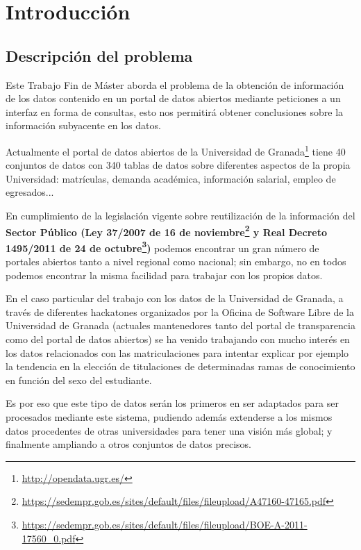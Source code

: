 \chapter{Introducción}

\section{Descripción del problema}

Este {\sf Trabajo Fin de Máster} aborda el problema de la obtención de información de los datos contenido en un portal de datos abiertos mediante peticiones a un interfaz en forma de consultas, esto nos permitirá obtener conclusiones sobre la información subyacente en los datos.

\bigskip
Actualmente el portal de datos abiertos de la {\sf Universidad de Granada}\footnote{\url{http://opendata.ugr.es/}} tiene 40 conjuntos de datos con 340 tablas de datos sobre diferentes aspectos de la propia Universidad: matrículas, demanda académica, información salarial, empleo de egresados...

\bigskip
En cumplimiento de la legislación vigente sobre reutilización de la información del \textbf{Sector Público (Ley 37/2007 de 16 de noviembre\footnote{\url{https://sedempr.gob.es/sites/default/files/fileupload/A47160-47165.pdf}} y Real Decreto 1495/2011 de 24 de octubre\footnote{\url{https://sedempr.gob.es/sites/default/files/fileupload/BOE-A-2011-17560\_0.pdf}})} podemos encontrar un gran número de portales abiertos tanto a nivel regional como nacional; sin embargo, no en todos podemos encontrar la misma facilidad para trabajar con los propios datos.

\bigskip
En el caso particular del trabajo con los datos de la {\sf Universidad de Granada}, a través de diferentes hackatones organizados por la {\sf Oficina de Software Libre de la Universidad de Granada} (actuales mantenedores tanto del portal de transparencia como del portal de datos abiertos) se ha venido trabajando con mucho interés en los datos relacionados con las matriculaciones para intentar explicar por ejemplo la tendencia en la elección de titulaciones de determinadas ramas de conocimiento en función del sexo del estudiante. 

\newpage
Es por eso que este tipo de datos serán los primeros en ser adaptados para ser procesados mediante este sistema, pudiendo además extenderse a los mismos datos procedentes de otras universidades para tener una visión más global; y finalmente ampliando a otros conjuntos de datos precisos. 

